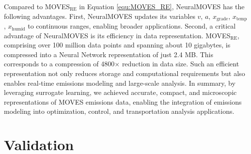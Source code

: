 \documentclass[12pt,english]{article}
\begin{document}
Compared to {MOVES}$_\text{RE}$ in Equation \ref{equ:MOVES_RE}, {NeuralMOVES} has the following advantages.
First, {NeuralMOVES} updates its variables $v$, $a$, $x_\text{grade}$, $x_\text{temp}$, $x_\text{humid}$ to continuous ranges, enabling broader applications.
Second, a critical advantage of NeuralMOVES is its efficiency in data representation. {MOVES}$_\text{RE}$, comprising over 100 million data points and spanning about 10 gigabytes, is compressed into a Neural Network representation of just 2.4 MB. This corresponds to a compression of 4800$\times$ reduction in data size. Such an efficient representation not only reduces storage and computational requirements but also enables real-time emissions modeling and large-scale analysis.
In summary, by leveraging surrogate learning, we achieved accurate, compact, and microscopic representations of MOVES emissions data, enabling the integration of emissions modeling into optimization, control, and transportation analysis applications.





\section{Validation}\label{sec:Validation}
\end{document}
